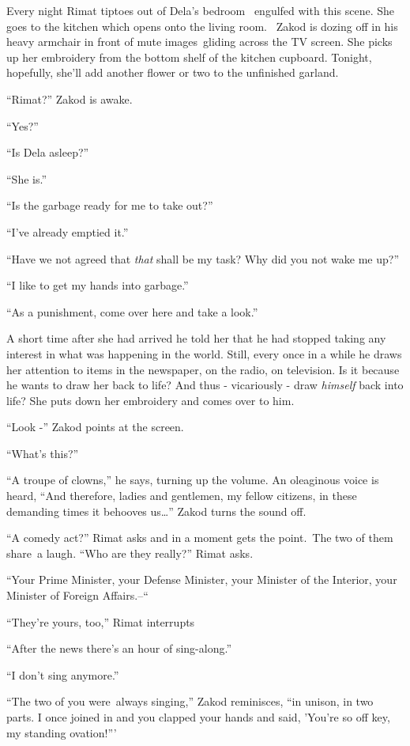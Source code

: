 \documentclass[twoside,11pt]{book}
\begin{document}
Every night Rimat tiptoes out of Dela's bedroom \ engulfed with this scene. She goes to the kitchen which opens onto the
living room. \ Zakod is dozing off in his heavy armchair in front of mute images~gliding across the TV screen. She
picks up her embroidery from the bottom shelf of the kitchen cupboard. Tonight, hopefully, she'll add another flower or
two to the unfinished garland.

``Rimat?'' Zakod is awake.

``Yes?''

``Is Dela asleep?''

``She is.''

``Is the garbage ready for me to take out?''

``I've already emptied it.''

``Have we not agreed that \textit{that} shall be my task? Why did you not wake me up?''

``I like to get my hands into garbage.''

``As a punishment, come over here and take a look.''

A short time after she had arrived he told her that he had stopped taking any interest in what was happening in the
world. Still, every once in a while he draws her attention to items in the newspaper, on the radio, on television. Is
it because he wants to draw her back to life? And thus - vicariously - draw \textit{himself} back into life? She puts
down her embroidery and comes over to him.

``Look -'' Zakod points at the screen.

``What's this?''

``A troupe of clowns,'' he says, turning up the volume. An oleaginous voice is heard,
``And therefore, ladies and gentlemen, my fellow citizens, in these demanding times it behooves
us{\dots}'' Zakod turns the sound off.

``A comedy act?'' Rimat asks and in a moment gets the point.~The two of them share~a laugh.
``Who are they really?'' Rimat asks.

``Your Prime Minister, your Defense Minister, your Minister of the Interior, your Minister of Foreign
Affairs.--``

``They're yours, too,'' Rimat interrupts

``After the news there's an hour of sing-along.''

``I don't sing anymore.''

``The two of you were~always singing,'' Zakod reminisces, ``in unison, in two
parts. I once joined in and you clapped your hands and said, 'You're so off key, my standing ovation!'''
\end{document}

